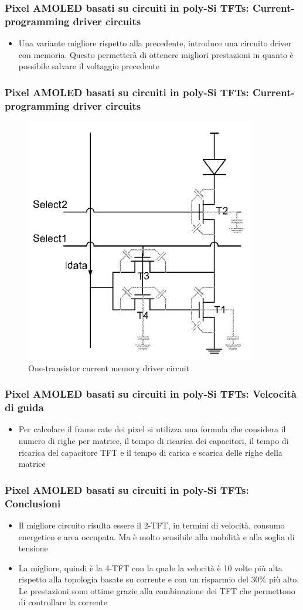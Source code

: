 \documentclass[12pt]{beamer}
\begin{document}
	\begin{frame}
		\frametitle{Pixel AMOLED basati su circuiti in poly-Si TFTs: Current-programming driver circuits}
		\begin{itemize}
			\item Una variante migliore rispetto alla precedente, introduce una circuito driver con memoria. Questo permetterà di ottenere migliori prestazioni in quanto è possibile salvare il voltaggio precedente
		\end{itemize}
	\end{frame}
	\begin{frame}
		\frametitle{Pixel AMOLED basati su circuiti in poly-Si TFTs: Current-programming driver circuits}
		\begin{figure}
			\centering
			\includegraphics[width=0.6\linewidth]{FISICA/one_tras_current}
			\caption{One-transistor current memory driver circuit}
			\label{fig:onetrascurrent}
		\end{figure}
	\end{frame}
	\begin{frame}
		\frametitle{Pixel AMOLED basati su circuiti in poly-Si TFTs: Velcocità di guida}
		\begin{itemize}
			\item Per calcolare il frame rate dei pixel	si utilizza una formula che considera il numero di righe per matrice, il tempo di ricarica dei capacitori, il tempo di ricarica del capacitore TFT e il tempo di carica e scarica delle righe della matrice
		\end{itemize}
	\end{frame}
	\begin{frame}
		\frametitle{Pixel AMOLED basati su circuiti in poly-Si TFTs: Conclusioni}
		\begin{itemize}
			\item Il migliore circuito risulta essere il 2-TFT, in termini di velocità, consumo energetico e area occupata. Ma è molto sensibile alla mobilità e alla soglia di tensione
			\pause
			\item La migliore, quindi è la 4-TFT con la quale la velocità è 10 volte più alta rispetto alla
			topologia basate su corrente e con un risparmio del 30\% più alto. Le prestazioni sono ottime grazie alla combinazione dei TFT che permettono di controllare la corrente
		\end{itemize}
	\end{frame}
\end{document}
